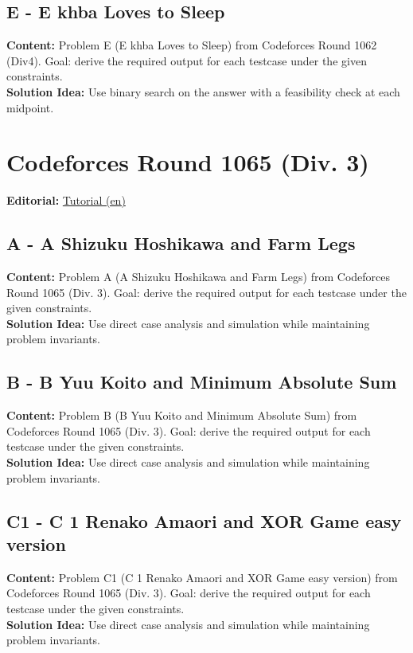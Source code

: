 \documentclass[11pt]{article}
\begin{document}
\subsection{E - E khba Loves to Sleep}
\textbf{Content:} Problem E (E khba Loves to Sleep) from Codeforces Round 1062 (Div4). Goal: derive the required output for each testcase under the given constraints.\\
\textbf{Solution Idea:} Use binary search on the answer with a feasibility check at each midpoint.

\section{Codeforces Round 1065 (Div. 3)}
\textbf{Editorial:} \href{https://codeforces.com/blog/entry/148567}{Tutorial (en)}

\subsection{A - A Shizuku Hoshikawa and Farm Legs}
\textbf{Content:} Problem A (A Shizuku Hoshikawa and Farm Legs) from Codeforces Round 1065 (Div. 3). Goal: derive the required output for each testcase under the given constraints.\\
\textbf{Solution Idea:} Use direct case analysis and simulation while maintaining problem invariants.

\subsection{B - B Yuu Koito and Minimum Absolute Sum}
\textbf{Content:} Problem B (B Yuu Koito and Minimum Absolute Sum) from Codeforces Round 1065 (Div. 3). Goal: derive the required output for each testcase under the given constraints.\\
\textbf{Solution Idea:} Use direct case analysis and simulation while maintaining problem invariants.

\subsection{C1 - C 1 Renako Amaori and XOR Game easy version}
\textbf{Content:} Problem C1 (C 1 Renako Amaori and XOR Game easy version) from Codeforces Round 1065 (Div. 3). Goal: derive the required output for each testcase under the given constraints.\\
\textbf{Solution Idea:} Use direct case analysis and simulation while maintaining problem invariants.
\end{document}
